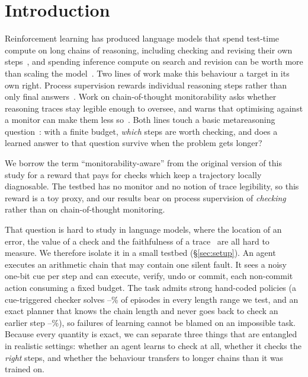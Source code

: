 \section{Introduction}
\label{sec:intro}

Reinforcement learning has produced language models that spend test-time compute on long chains of reasoning, including checking and revising their own steps~\citep{openai2024reasoning,deepseek2025r1,kumar2024score}, and spending inference compute on search and revision can be worth more than scaling the model~\citep{snell2024scaling}. Two lines of work make this behaviour a target in its own right. Process supervision rewards individual reasoning steps rather than only final answers~\citep{uesato2022process,lightman2024verify}. Work on chain-of-thought monitorability asks whether reasoning traces stay legible enough to oversee, and warns that optimising against a monitor can make them less so~\citep{baker2025monitoring,korbak2025cot,openai2025monitorability}. Both lines touch a basic metareasoning question~\citep{russell1991principles,hay2012selecting}: with a finite budget, \emph{which} steps are worth checking, and does a learned answer to that question survive when the problem gets longer?

We borrow the term ``monitorability-aware'' from the original version of this study for a reward that pays for checks which keep a trajectory locally diagnosable. The testbed has no monitor and no notion of trace legibility, so this reward is a toy proxy, and our results bear on process supervision of \emph{checking} rather than on chain-of-thought monitoring.

That question is hard to study in language models, where the location of an error, the value of a check and the faithfulness of a trace~\citep{turpin2023unfaithful,lanham2023faithfulness,chen2025reasoning} are all hard to measure. We therefore isolate it in a small testbed (\S\ref{sec:setup}). An agent executes an arithmetic chain that may contain one silent fault. It sees a noisy one-bit cue per step and can execute, verify, undo or commit, each non-commit action consuming a fixed budget. The task admits strong hand-coded policies (a cue-triggered checker solves --\% of episodes in every length range we test, and an exact planner that knows the chain length and never goes back to check an earlier step --\%), so failures of learning cannot be blamed on an impossible task. Because every quantity is exact, we can separate three things that are entangled in realistic settings: whether an agent learns to check at all, whether it checks the \emph{right} steps, and whether the behaviour transfers to longer chains than it was trained on.


